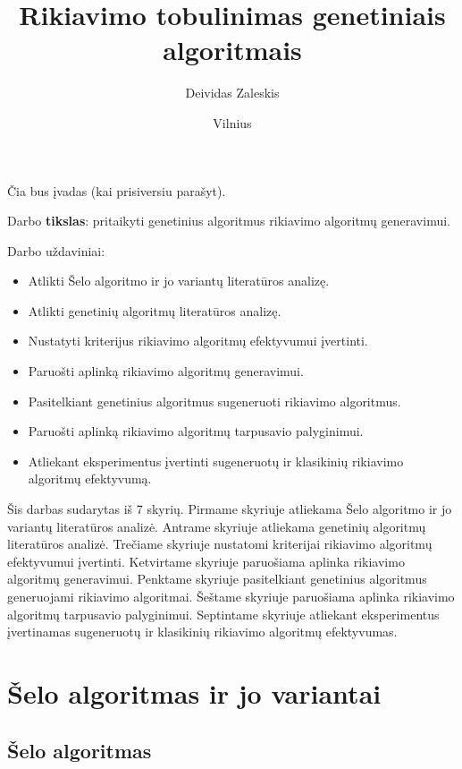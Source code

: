\documentclass{VUMIFInfKursinis}
\institute{Informatikos institutas}  %
\title{Rikiavimo tobulinimas genetiniais algoritmais}
\author{Deividas Zaleskis}
\date{Vilnius \\ \the\year}
\begin{document}
\maketitle

\tableofcontents


Čia bus įvadas (kai prisiversiu parašyt).

Darbo \textbf{tikslas}:
pritaikyti genetinius algoritmus rikiavimo algoritmų generavimui.

Darbo uždaviniai:
\begin{itemize}
  \item Atlikti Šelo algoritmo ir jo variantų literatūros analizę.
  \item Atlikti genetinių algoritmų literatūros analizę. %
  \item Nustatyti kriterijus rikiavimo algoritmų efektyvumui įvertinti.
  \item Paruošti aplinką rikiavimo algoritmų generavimui.
  \item Pasitelkiant genetinius algoritmus sugeneruoti rikiavimo algoritmus.
  \item Paruošti aplinką rikiavimo algoritmų tarpusavio palyginimui.
  \item Atliekant eksperimentus įvertinti sugeneruotų ir klasikinių rikiavimo algoritmų efektyvumą. %
\end{itemize}

Šis darbas sudarytas iš 7 skyrių.
Pirmame skyriuje atliekama Šelo algoritmo ir jo variantų literatūros analizė.
Antrame skyriuje atliekama genetinių algoritmų literatūros analizė. %
Trečiame skyriuje nustatomi kriterijai rikiavimo algoritmų efektyvumui įvertinti.
Ketvirtame skyriuje paruošiama aplinka rikiavimo algoritmų generavimui.
Penktame skyriuje pasitelkiant genetinius algoritmus generuojami rikiavimo algoritmai.
Šeštame skyriuje paruošiama aplinka rikiavimo algoritmų tarpusavio palyginimui.
Septintame skyriuje atliekant eksperimentus įvertinamas sugeneruotų ir klasikinių rikiavimo algoritmų efektyvumas. %

\section{Šelo algoritmas ir jo variantai}

\subsection{Šelo algoritmas}
\end{document}
